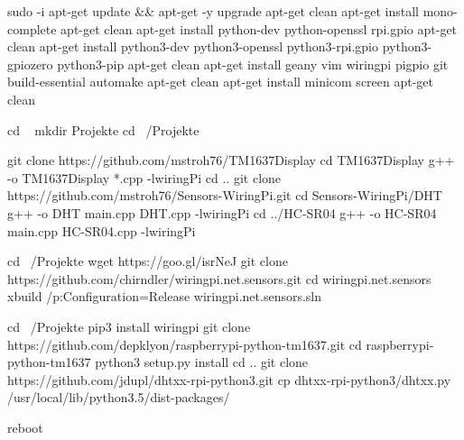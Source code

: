 
\begin{console}
sudo -i
apt-get update && apt-get -y upgrade
apt-get clean
apt-get install mono-complete
apt-get clean
apt-get install python-dev python-openssl rpi.gpio
apt-get clean
apt-get install python3-dev python3-openssl python3-rpi.gpio python3-gpiozero python3-pip
apt-get clean
apt-get install geany vim wiringpi pigpio git build-essential automake
apt-get clean
apt-get install minicom screen
apt-get clean

cd ~
mkdir Projekte
cd ~/Projekte

git clone https://github.com/mstroh76/TM1637Display
cd TM1637Display
g++ -o TM1637Display *.cpp -lwiringPi
cd ..
git clone https://github.com/mstroh76/Sensors-WiringPi.git
cd Sensors-WiringPi/DHT
g++ -o DHT main.cpp DHT.cpp -lwiringPi
cd ../HC-SR04
g++ -o HC-SR04 main.cpp HC-SR04.cpp -lwiringPi

cd ~/Projekte
wget https://goo.gl/isrNeJ
git clone https://github.com/chirndler/wiringpi.net.sensors.git
cd wiringpi.net.sensors
xbuild /p:Configuration=Release wiringpi.net.sensors.sln

cd ~/Projekte
pip3 install wiringpi
git clone https://github.com/depklyon/raspberrypi-python-tm1637.git
cd raspberrypi-python-tm1637
python3 setup.py install
cd ..
git clone https://github.com/jdupl/dhtxx-rpi-python3.git
cp dhtxx-rpi-python3/dhtxx.py /usr/local/lib/python3.5/dist-packages/

reboot
\end{console}
